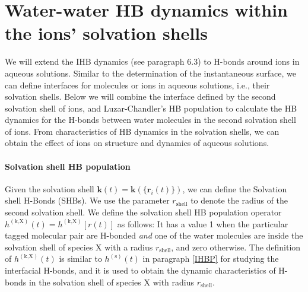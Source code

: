 %
%
\FloatBarrier
\section{Water-water HB dynamics within the ions' solvation shells} \label{PARA_SHBD}
We will extend the IHB dynamics (see paragraph 6.3) to H-bonds around ions in aqueous solutions. 
Similar to the determination of the instantaneous surface, we can define interfaces for molecules or ions in aqueous solutions, i.e., 
their solvation shells. 
Below we will combine the interface defined by the second solvation shell of ions, 
and Luzar-Chandler's HB population \cite{AL96} to calculate the HB
dynamics for the H-bonds between water molecules in the second solvation shell of ions.
From characteristics of HB dynamics in the solvation shells, we can obtain the effect of ions on structure and dynamics of aqueous solutions. 

\paragraph{Solvation shell HB population}\label{para:SHBP}
Given the solvation shell ${\mathbf k}(t)={\mathbf k}(\{{\mathbf r}_i(t)\})$, we can define the Solvation shell H-Bonds (SHBs).
We use the parameter $r_\text{shell}$ to denote the radius of the second solvation shell.
We define the solvation shell HB population operator $h^{(\text{k,X})}(t) = h^{(\text{k,X})}[{r}(t)]$ as follows:
It has a value 1 when the particular tagged molecular pair are H-bonded \emph{and} one of the water molecules are inside the solvation shell of species X
with a radius $r_\text{shell}$, and zero otherwise. 
The definition of $h^{(\text{k,X})}(t)$ is similar to $h^{(\text{s})}(t)$ in paragraph \ref{IHBP} for studying the interfacial H-bonds, and it is used to obtain the dynamic characteristics of H-bonds in the solvation shell of species X with radius $r_\text{shell}$. 

